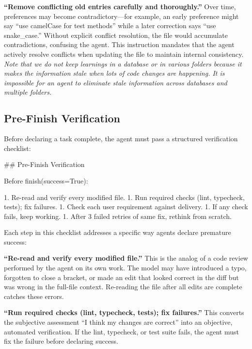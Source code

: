 \documentclass{article}
\begin{document}
\textbf{``Remove conflicting old entries carefully and thoroughly.''}  Over time, preferences may become contradictory---for example, an early preference might say ``use camelCase for test methods'' while a later correction says ``use snake\_case.'' Without explicit conflict resolution, the file would accumulate contradictions, confusing the agent.  This instruction mandates that the agent actively resolve conflicts when updating the file to maintain internal consistency.  \emph{Note that we do not keep learnings in a database or in various folders because it makes the information stale when lots of code changes are happening.  It is impossible for an agent to eliminate stale information across databases and multiple folders.}

\subsection{Pre-Finish Verification}

Before declaring a task complete, the agent must pass a structured verification checklist:

\begin{prompt}
## Pre-Finish Verification

Before finish(success=True):

1. Re-read and verify every modified file.
1. Run required checks (lint, typecheck, tests); fix failures.
1. Check each user requirement against delivery.
1. If any check fails, keep working.
1. After 3 failed retries of same fix, rethink from scratch.
\end{prompt}

\noindent Each step in this checklist addresses a specific way agents declare premature success:

\textbf{``Re-read and verify every modified file.''}  This is the analog of a code review performed by the agent on its own work.  The model may have introduced a typo, forgotten to close a bracket, or made an edit that looked correct in the diff but was wrong in the full-file context.  Re-reading the file after all edits are complete catches these errors.

\textbf{``Run required checks (lint, typecheck, tests); fix failures.''}  This converts the subjective assessment ``I think my changes are correct'' into an objective, automated verification.  If the lint, typecheck, or test suite fails, the agent must fix the failure before declaring success.
\end{document}
